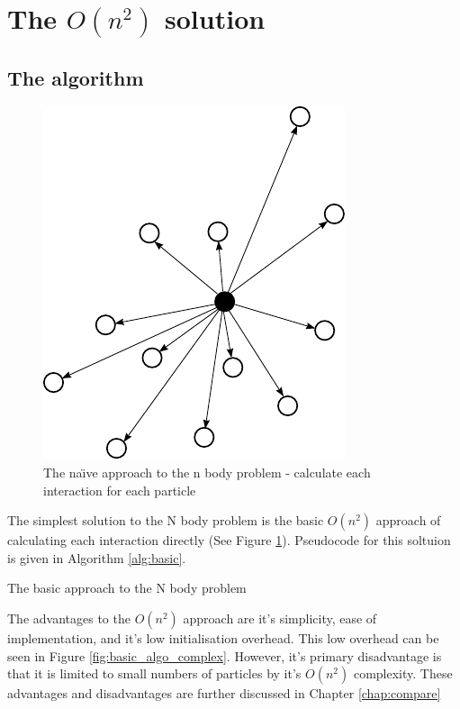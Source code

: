 \documentclass[pdftex,twoside,a4paper]{report}
\newcommand{\bcen}{\begin{center}}
\newcommand{\ecen}{\end{center}}
\begin{document}
\section{The $O(n^2)$ solution}
\subsection{The algorithm}
        
\begin{figure}
\bcen \includegraphics{figures/nbodies.pdf} \ecen
\caption{The na\"{\i}ve approach to the n body problem - calculate each interaction for each particle}
\label{fig:basic_alg_diag}
\end{figure}

The simplest solution to the N body problem is the basic $O(n^2)$ approach of calculating each interaction directly (See Figure \ref{fig:basic_alg_diag}). Pseudocode for this soltuion is given in Algorithm \ref{alg:basic}.\\

\begin{algorithm}
 \SetLine
 \caption{The basic approach to the N body problem}
 \label{alg:basic}
\end{algorithm}

The advantages to the $O(n^2)$ approach are it's simplicity, ease of implementation, and it's low initialisation overhead. This low overhead can be seen in Figure \ref{fig:basic_algo_complex}. However, it's primary disadvantage is that it is limited to small numbers of particles by it's $O(n^2)$ complexity. These advantages and disadvantages are further discussed in Chapter \ref{chap:compare}
\end{document}
